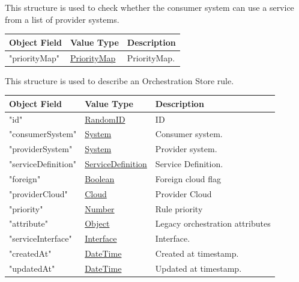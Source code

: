 \documentclass[a4paper]{arrowhead}
\newcommand{\pref}[1]{{\textcolor{ArrowheadGrey}{\hyperref[sec:model:primitives:#1]{#1}}}}
\begin{document}

This structure is used to check whether the consumer system can use a service from a list of provider systems.

\begin{table}[ht!]
\begin{tabularx}{\textwidth}{| p{5cm} | p{5cm} | X |} \hline
\rowcolor{gray!33} Object Field & Value Type      & Description \\ \hline
"priorityMap"                   & \pref{PriorityMap}     & PriorityMap. \\ \hline

\end{tabularx}
\end{table}



This structure is used to describe an Orchestration Store rule.

\begin{table}[ht!]
\begin{tabularx}{\textwidth}{| p{5cm} | p{5cm} | X |} \hline
\rowcolor{gray!33} Object Field & Value Type      & Description \\ \hline
"id"                 & \pref{RandomID}                     & ID \\ \hline
"consumerSystem"     & \pref{System}                       & Consumer system. \\ \hline
"providerSystem"     & \pref{System}                       & Provider system. \\ \hline
"serviceDefinition"  & \pref{ServiceDefinition}            & Service Definition. \\ \hline
"foreign"            & \pref{Boolean}                      & Foreign cloud flag \\ \hline
"providerCloud"      & \pref{Cloud}                        & Provider Cloud \\ \hline
"priority"           & \pref{Number}                       & Rule priority \\ \hline
"attribute"          & \pref{Object}                       & Legacy orchestration attributes \\ \hline
"serviceInterface"   & \pref{Interface}                    & Interface. \\ \hline
"createdAt"          & \pref{DateTime}                     & Created at timestamp. \\ \hline
"updatedAt"          & \pref{DateTime}                     & Updated at timestamp. \\ \hline

\end{tabularx}
\end{table}
\end{document}
